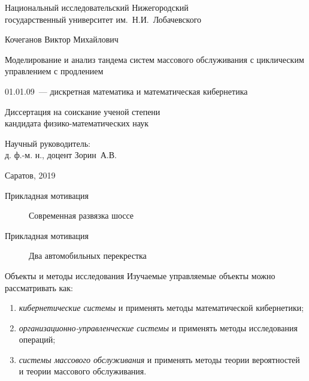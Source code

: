 \documentclass[10pt]{beamer}
\begin{document}
\begin{frame}
	
	\begin{center}
		{\small 
		Национальный исследовательский Нижегородский\\
		государственный университет им.~Н.И.~Лобачевского
		}
		\bigskip
		
 		{
Кочеганов Виктор Михайлович			
			\medskip
			
			{\large
Моделирование и анализ тандема систем массового обслуживания с циклическим
управлением с продлением
}
			
 		}
		\vfill
		
		{\small 01.01.09~--- дискретная математика и математическая кибернетика}
		\medskip
		
		
		{\small Диссертация на соискание ученой степени\\ кандидата физико-математических наук }
		
	\end{center}
	
	\vfill
	
	
	\hfill 
	\begin{minipage}[h]{0.56\linewidth}\small
		Научный руководитель:\\
		д. ф.-м. н., доцент Зорин~А.В.
	\end{minipage}
	
	\vfill
	
	
	\centerline{\small Саратов, 2019}  
	
\end{frame}
  \begin{frame}{Прикладная мотивация}
      \begin{figure}[h]
    \centering
    \caption{Современная развязка шоссе}
    \label{VK:fig:1}
  \end{figure}
\end{frame}
  \begin{frame}{Прикладная мотивация}
      \begin{figure}[h]
    \centering
    \caption{Два автомобильных перекрестка}
    \label{VK:fig:1}
  \end{figure}
\end{frame}


\begin{frame}{Объекты и методы исследования}
Изучаемые управляемые объекты можно рассматривать как:
\begin{enumerate}
    \item {\it кибернетические системы} и применять методы математической кибернетики;
    \item {\it организационно-управленческие системы} и применять методы исследования операций;
    \item {\it системы массового обслуживания} и применять методы теории вероятностей и теории массового обслуживания.
\end{enumerate}
\end{frame}
\end{document}
